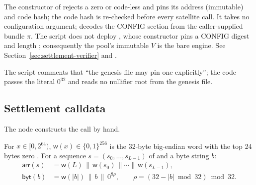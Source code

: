\begin{property}
\label{prop:deploy-verifier}
The constructor of  rejects a zero or code-less
 and pins its address (immutable) and code hash; the code
hash is re-checked before every satellite call.
It takes no configuration argument;  decodes the CONFIG section
from the caller-supplied bundle $\pi$.
The script does not deploy , whose constructor pins a
CONFIG digest and length
; consequently
the pool's immutable $V$ is the bare engine. See
Section~\ref{sec:settlement-verifier} and
.
\end{property}

\begin{specdelta}
The script comments that ``the genesis file may pin one explicitly''; the code
passes the literal $0^{32}$ and reads no nullifier root from the genesis
file. 
\end{specdelta}

\subsection{Settlement calldata}
\label{subsec:pool-calldata}

The node constructs the call by hand.

\begin{definition}
\label{def:settle-enc}
For $x \in [0,2^{64})$, $\mathsf{w}(x)\in\{0,1\}^{256}$ is the 32-byte big-endian
word with the top 24 bytes zero
. For a sequence
$s = (s_0,\dots,s_{L-1})$ of  and a byte string $b$:
\begin{align}
  \mathsf{arr}(s) &= \mathsf{w}(L)\,\|\,\mathsf{w}(s_0)\,\|\cdots\|\,\mathsf{w}(s_{L-1}),
  \\
  \mathsf{byt}(b) &= \mathsf{w}(|b|)\,\|\,b\,\|\,0^{8\rho},\qquad
  \rho = (32 - |b| \bmod 32) \bmod 32 .
\end{align}
\end{definition}

